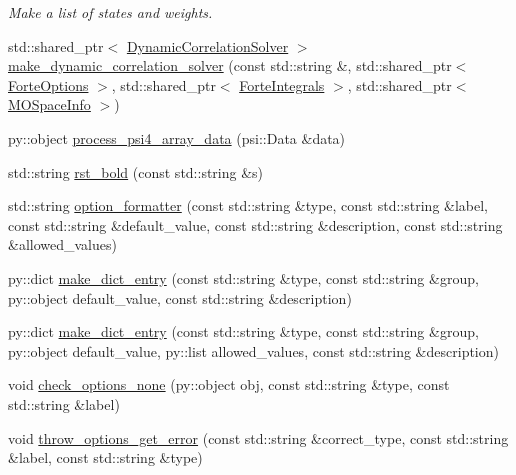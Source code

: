 \begin{DoxyCompactItemize}
\begin{DoxyCompactList}\small\item\em Make a list of states and weights. \end{DoxyCompactList}\item 
std\+::shared\+\_\+ptr$<$ \mbox{\hyperlink{classforte_1_1_dynamic_correlation_solver}{Dynamic\+Correlation\+Solver}} $>$ \mbox{\hyperlink{namespaceforte_a63b91e27acecb2c086aa8089c7a00136}{make\+\_\+dynamic\+\_\+correlation\+\_\+solver}} (const std\+::string \&, std\+::shared\+\_\+ptr$<$ \mbox{\hyperlink{classforte_1_1_forte_options}{Forte\+Options}} $>$, std\+::shared\+\_\+ptr$<$ \mbox{\hyperlink{classforte_1_1_forte_integrals}{Forte\+Integrals}} $>$, std\+::shared\+\_\+ptr$<$ \mbox{\hyperlink{classforte_1_1_m_o_space_info}{M\+O\+Space\+Info}} $>$)
\item 
py\+::object \mbox{\hyperlink{namespaceforte_a1f1e8fac233e0761c98d87f879ceef93}{process\+\_\+psi4\+\_\+array\+\_\+data}} (psi\+::\+Data \&data)
\item 
std\+::string \mbox{\hyperlink{namespaceforte_adb089a7fca4b9438c8567ac2aad19ff9}{rst\+\_\+bold}} (const std\+::string \&s)
\item 
std\+::string \mbox{\hyperlink{namespaceforte_a4aee7d3c65f8b1486e248c1b70f60f97}{option\+\_\+formatter}} (const std\+::string \&type, const std\+::string \&label, const std\+::string \&default\+\_\+value, const std\+::string \&description, const std\+::string \&allowed\+\_\+values)
\item 
py\+::dict \mbox{\hyperlink{namespaceforte_aef5ff6d138664503d4ab9593ab649f26}{make\+\_\+dict\+\_\+entry}} (const std\+::string \&type, const std\+::string \&group, py\+::object default\+\_\+value, const std\+::string \&description)
\item 
py\+::dict \mbox{\hyperlink{namespaceforte_a66e62ab4e148d491468404a5658303d1}{make\+\_\+dict\+\_\+entry}} (const std\+::string \&type, const std\+::string \&group, py\+::object default\+\_\+value, py\+::list allowed\+\_\+values, const std\+::string \&description)
\item 
void \mbox{\hyperlink{namespaceforte_ac876390be637f4d5b66bdee731dbce66}{check\+\_\+options\+\_\+none}} (py\+::object obj, const std\+::string \&type, const std\+::string \&label)
\item 
void \mbox{\hyperlink{namespaceforte_a773a0cefeb3383fa161b9429b2fcf716}{throw\+\_\+options\+\_\+get\+\_\+error}} (const std\+::string \&correct\+\_\+type, const std\+::string \&label, const std\+::string \&type)
\item 

\end{DoxyCompactItemize}
